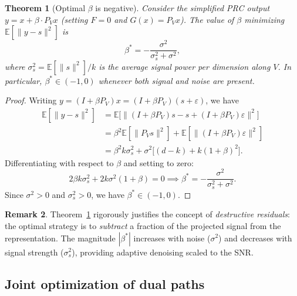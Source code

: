 \documentclass[11pt,a4paper]{article}
\newtheorem{theorem}{Theorem}[section]
\theoremstyle{definition}
\newtheorem{remark}[theorem]{Remark}
\begin{document}
\begin{theorem}[Optimal $\beta$ is negative]
\label{thm:optimal-beta}
Consider the simplified PRC output $y = x + \beta \cdot P_V x$
(setting $F = 0$ and $G(x) = P_V x$). The value of $\beta$ minimizing
$\mathbb{E}[\|y - s\|^2]$ is
\[
  \beta^* = -\frac{\sigma^2}{\sigma_s^2 + \sigma^2},
\]
where $\sigma_s^2 = \mathbb{E}[\|s\|^2]/k$ is the average signal power per
dimension along $V$. In particular, $\beta^* \in (-1, 0)$ whenever both signal
and noise are present.
\end{theorem}

\begin{proof}
Writing $y = (I + \beta P_V)x = (I + \beta P_V)(s + \varepsilon)$, we have
\begin{align*}
  \mathbb{E}[\|y - s\|^2]
  &= \mathbb{E}\bigl[\|(I + \beta P_V)s - s + (I + \beta P_V)\varepsilon\|^2\bigr] \\
  &= \beta^2 \mathbb{E}[\|P_V s\|^2]
     + \mathbb{E}[\|(I + \beta P_V)\varepsilon\|^2] \\
  &= \beta^2 k\sigma_s^2
     + \sigma^2\bigl[(d - k) + k(1 + \beta)^2\bigr].
\end{align*}
Differentiating with respect to $\beta$ and setting to zero:
\[
  2\beta k\sigma_s^2 + 2k\sigma^2(1 + \beta) = 0
  \implies \beta^* = -\frac{\sigma^2}{\sigma_s^2 + \sigma^2}.
\]
Since $\sigma^2 > 0$ and $\sigma_s^2 > 0$, we have $\beta^* \in (-1, 0)$.
\end{proof}

\begin{remark}
Theorem~\ref{thm:optimal-beta} rigorously justifies the concept of
\emph{destructive residuals}: the optimal strategy is to \emph{subtract}
a fraction of the projected signal from the representation. The magnitude
$|\beta^*|$ increases with noise ($\sigma^2$) and decreases with signal
strength ($\sigma_s^2$), providing adaptive denoising scaled to the SNR.
\end{remark}

\subsection{Joint optimization of dual paths}
\end{document}
